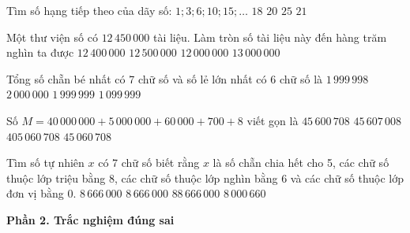 \begin{ex} %
Tìm số hạng tiếp theo của dãy số: $1; 3; 6; 10; 15; \dots$
\choice
{$18$}
{$20$}
{$25$}
{\True $21$}
\end{ex}

\begin{ex} %
Một thư viện số có $12\,450\,000$ tài liệu. Làm tròn số tài liệu này đến hàng trăm nghìn ta được
\choice
{$12\,400\,000$}
{\True $12\,500\,000$}
{$12\,000\,000$}
{$13\,000\,000$}
\end{ex}

\begin{ex} %
Tổng số chẵn bé nhất có 7 chữ số và số lẻ lớn nhất có 6 chữ số là
\choice
{$1\,999\,998$}
{$2\,000\,000$}
{\True $1\,999\,999$}
{$1\,099\,999$}
\end{ex}

\begin{ex} %
Số $M = 40\,000\,000 + 5\,000\,000 + 60\,000 + 700 + 8$ viết gọn là
\choice
{$45\,600\,708$}
{$45\,607\,008$}
{$405\,060\,708$}
{\True $45\,060\,708$}
\end{ex}

\begin{ex} %
Tìm số tự nhiên $x$ có 7 chữ số biết rằng $x$ là số chẵn chia hết cho 5, các chữ số thuộc lớp triệu bằng 8, các chữ số thuộc lớp nghìn bằng 6 và các chữ số thuộc lớp đơn vị bằng 0.
\choice
{\True $8\,666\,000$}
{$8\,666\,000$}
{$88\,666\,000$}
{$8\,000\,660$}
\end{ex}

\textbf{Phần 2. Trắc nghiệm đúng sai}


